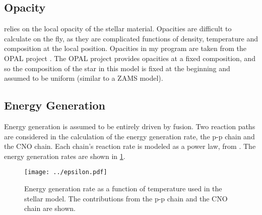 \documentclass[10pt]{article}
\begin{document}
\subsection{Opacity} \label{sec:opacity}
 relies on the local opacity of the stellar material. Opacities are difficult to calculate on the fly, as they are complicated functions of density, temperature and composition at the local position. Opacities in my program are taken from the OPAL project \citep{1996ApJ...456..902R}. The OPAL project provides opacities at a fixed composition, and so the composition of the star in this model is fixed at the beginning and assumed to be uniform (similar to a ZAMS model).

\subsection{Energy Generation} \label{sec:fusion}
Energy generation is assumed to be entirely driven by fusion. Two reaction paths are considered in the calculation of the energy generation rate, the p-p chain and the CNO chain. Each chain's reaction rate is modeled as a power law, from \citet{Kippenhahn:1994tm}. The energy generation rates are shown in \cref{fig:energy}.

\begin{figure}[htbp]
   \centering
   \texttt{[image: ../epsilon.pdf]}
   \caption[Energy Generation Rate]{Energy generation rate as a function of temperature used in the stellar model. The contributions from the p-p chain and the CNO chain are shown.}
   \label{fig:energy}
\end{figure}

\end{document}
